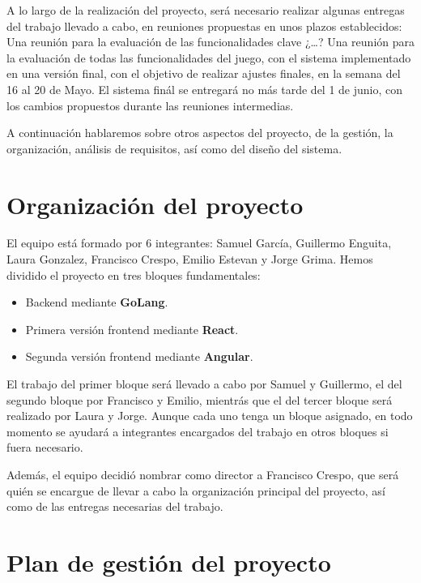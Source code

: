 \documentclass[11pt, a4paper, titlepage]{article}
\begin{document}
A lo largo de la realización del proyecto, será necesario realizar algunas entregas del trabajo llevado a cabo, en reuniones propuestas en unos plazos establecidos:\newline
Una reunión para la evaluación de las funcionalidades clave ¿…?\newline
Una reunión para la evaluación de todas las funcionalidades del juego, con el sistema implementado en una versión final, con el objetivo de realizar ajustes finales, en la semana del 16 al 20 de Mayo.\newline
El sistema finál se entregará no más tarde del 1 de junio, con los cambios propuestos durante las reuniones intermedias.

A continuación hablaremos sobre otros aspectos del proyecto, de la gestión, la organización, análisis de requisitos, así como del diseño del sistema.

\section{Organización del proyecto}
El equipo está formado por 6 integrantes: Samuel García, Guillermo Enguita, Laura Gonzalez, Francisco Crespo, Emilio Estevan y Jorge Grima.
Hemos dividido el proyecto en tres bloques fundamentales:\newline
\begin{itemize}
    \item Backend mediante \textbf{GoLang}.
    \item Primera versión frontend mediante \textbf{React}.
    \item Segunda versión frontend mediante \textbf{Angular}.\newline
\end{itemize}

El trabajo del primer bloque será llevado a cabo por Samuel y Guillermo, el del segundo bloque por Francisco y Emilio, mientrás que el del tercer bloque será realizado por Laura y Jorge. 
Aunque cada uno tenga un bloque asignado, en todo momento se ayudará a integrantes encargados del trabajo en otros bloques si fuera necesario. \newline

Además, el equipo decidió nombrar como director a Francisco Crespo, que será quién se encargue de llevar a cabo la organización principal del proyecto, así como de las entregas necesarias del trabajo.

\section{Plan de gestión del proyecto}
\end{document}
